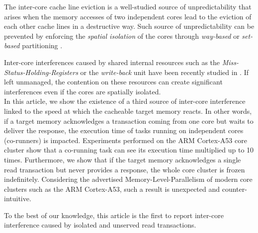     The inter-core cache line eviction is a well-studied source of unpredictability that arises when the memory accesses of two independent cores lead to the eviction of each other cache lines in a destructive way.
    Such source of unpredictability can be prevented by enforcing the \emph{spatial isolation} of the cores through \emph{way-based} or \emph{set-based} partitioning \cite{Mancuso2013RealtimeCM, 6755286, Giovani_cahe_partitioning_survey}.

    Inter-core interferences caused by shared internal resources such as the \emph{Miss-Status-Holding-Registers} or the \emph{write-back} unit have been recently studied in \cite{Valsan2017AddressingIC, Heechul_DDOS_attacks_on_shared_cache}.
    If left unmanaged, the contention on these resources can create significant interferences even if the cores are spatially isolated.\\

    In this article, we show the existence of a third source of inter-core interference linked to the speed at which the cacheable target memory reacts.
    In other words, if a target memory acknowledges a transaction coming from one core but waits to deliver the response, the execution time of tasks running on independent cores (co-runners) is impacted.
    Experiments performed on the ARM Cortex-A53 core cluster \cite{ARM-cortex-A53} show that a co-running task can see its execution time multiplied up to 10 times.
    Furthermore, we show that if the target memory acknowledges a single read transaction but never provides a response, the whole core cluster is frozen indefinitely.
    Considering the advertised Memory-Level-Parallelism of modern core clusters such as the ARM Cortex-A53, such a result is unexpected and counter-intuitive.


    To the best of our knowledge, this article is the first to report inter-core interference caused by isolated and unserved read transactions.

